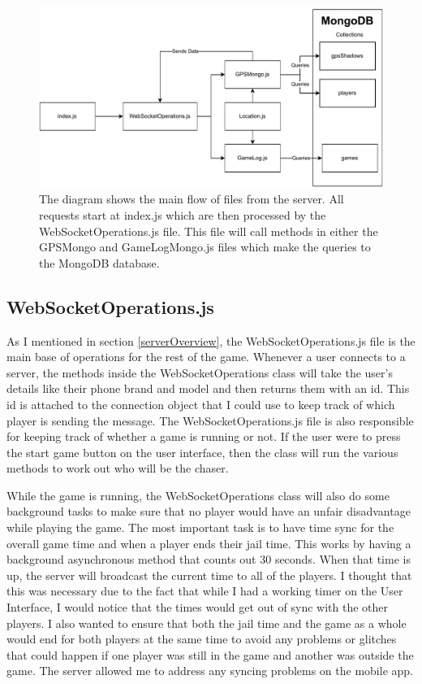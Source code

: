 \documentclass{l4proj}
\begin{document}
\begin{figure}
    \centering
    \includegraphics[width=\linewidth]{images/serverSideOverview.pdf}    

    \caption{
        The diagram shows the main flow of files from the server. All requests start at index.js which are
        then processed by the WebSocketOperations.js file. This file will call methods in either the GPSMongo
        and GameLogMongo.js files which make the queries to the MongoDB database.  
    }

    \label{fig:serverSideOverview} 
\end{figure}


\subsection{WebSocketOperations.js}
As I mentioned in section \ref{serverOverview}, the WebSocketOperations.js file is the main base of operations for
the rest of the game. Whenever a user connects to a server, the methods inside the WebSocketOperations class will take
the user's details like their phone brand and model and then returns them with an id. This id is attached to the connection
object that I could use to keep track of which player is sending the message. The WebSocketOperations.js file is also
responsible for keeping track of whether a game is running or not. If the user were to press the start game button on the
user interface, then the class will run the various methods to work out who will be the chaser.

While the game is running, the WebSocketOperations class will also do some background tasks to make sure that no
player would have an unfair disadvantage while playing the game. The most important task is to have time sync for
the overall game time and when a player ends their jail time. This works by having a background asynchronous method
that counts out 30 seconds. When that time is up, the server will broadcast the current time to all of the players.
I thought that this was necessary due to the fact that while I had a working timer on the User Interface, I would
notice that the times would get out of sync with the other players. I also wanted to ensure that both the jail time
and the game as a whole would end for both players at the same time to avoid any problems or glitches that could happen
if one player was still in the game and another was outside the game. The server allowed me to address any syncing
problems on the mobile app.
\end{document}
